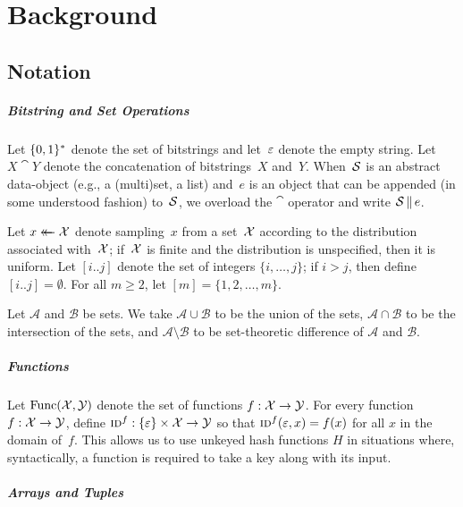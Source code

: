 \chapter{Background}


\section{Notation}

\paragraph{Bitstring and Set Operations}

Let $\{0,1\}^*$ denote the set of bitstrings and let~$\varepsilon$ denote the empty
string. Let $X \cat Y$ denote the concatenation of bitstrings~$X$ and~$Y$.  When~$\mathcal{S}$ is an abstract data-object (e.g., a (multi)set, a list) and~$e$ is an object that can be appended (in some understood fashion) to~$\mathcal{S}$, we overload the $\cat$ operator and write $\mathcal{S} \, \| \, e$.

Let $x \mathrel{\leftarrow\mkern-14mu\leftarrow} \mathcal{X}$ denote sampling~$x$ from a set~$\mathcal{X}$ according to the distribution associated with~$\mathcal{X}$; if~$\mathcal{X}$ is finite and the distribution is unspecified, then it is uniform. Let $[i..j]$ denote the set of integers $\{i, \ldots, j\}$; if $i > j$, then define $[i..j] = \emptyset$. For all $m \geq 2$, let $[m] = \{1,2,\ldots,m\}$.

Let $\mathcal{A}$ and $\mathcal{B}$ be sets. We take $\mathcal{A} \cup \mathcal{B}$ to be the union of the sets, $\mathcal{A} \cap \mathcal{B}$ to be the intersection of the sets, and $\mathcal{A} \setminus \mathcal{B}$ to be set-theoretic difference of $\mathcal{A}$ and $\mathcal{B}$.

\paragraph{Functions}

Let $\mathrm{Func}(\mathcal{X},\mathcal{Y})$ denote the set of functions $f:\mathcal{X}\to\mathcal{Y}$. For every function~$f: \mathcal{X} \to \mathcal{Y}$, define $\textnormal{\textsc{id}}^f: \{\varepsilon\} \times \mathcal{X} \to \mathcal{Y}$ so that $\textnormal{\textsc{id}}^f(\varepsilon, x) = f(x)$ for all $x$ in the domain of~$f$. This allows us to use unkeyed hash functions $H$ in situations where, syntactically, a function is required to take a key along with its input. 

\paragraph{Arrays and Tuples}

